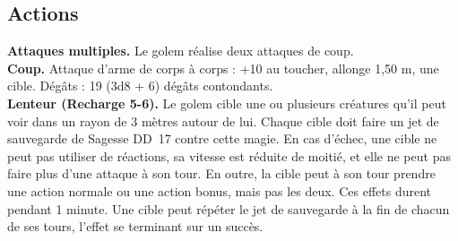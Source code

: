 \begin{figure*}[hbp]
{\begin{minipage}[c]{.45\linewidth}
    \subsection*{Actions}
    {\bfseries Attaques multiples.} Le golem réalise deux attaques de coup.\\
    {\bfseries Coup.} Attaque d'arme de corps à corps : +10 au toucher, allonge 1,50 m, une cible. 
               Dégâts : 19 (3d8 + 6) dégâts contondants. \\
    {\bfseries Lenteur (Recharge 5-6).} Le golem cible une ou plusieurs créatures qu'il peut voir dans un 
               rayon de 3 mètres autour de lui. Chaque cible doit faire un jet de sauvegarde de Sagesse 
               DD~17 contre cette magie. En cas d'échec, une cible ne peut pas utiliser de réactions, sa 
               vitesse est réduite de moitié, et elle ne peut pas faire plus d'une attaque à son tour. En 
               outre, la cible peut à son tour prendre une action normale ou une action bonus, mais pas les 
               deux. Ces effets durent pendant 1 minute. Une cible peut répéter le jet de sauvegarde à la 
               fin de chacun de ses tours, l'effet se terminant sur un succès.
  \end{minipage}
}%
\end{figure*}

